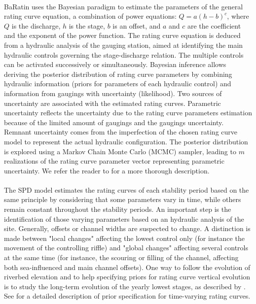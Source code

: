\documentclass[11pt]{article}
\begin{document}
    \paragraph{} BaRatin uses the Bayesian paradigm to estimate the parameters of the general rating curve equation, a combination of power equations: $Q = a(h-b)^c$, where $Q$ is the discharge, $h$ is the stage, $b$ is an offset, and $a$ and $c$ are the coefficient and the exponent of the power function. The rating curve equation is deduced from a hydraulic analysis of the gauging station, aimed at identifying the main hydraulic controls governing the stage-discharge relation. The multiple controls can be activated successively or simultaneously. Bayesian inference allows deriving the posterior distribution of rating curve parameters by combining hydraulic information (priors for parameters of each hydraulic control) and information from gaugings with uncertainty (likelihood). Two sources of uncertainty are associated with the estimated rating curves. Parametric uncertainty reflects the uncertainty due to the rating curve parameters estimation because of the limited amount of gaugings and the gaugings uncertainty. Remnant uncertainty comes from the imperfection of the chosen rating curve model to represent the actual hydraulic configuration. The posterior distribution is explored using a Markov Chain Monte Carlo (MCMC) sampler, leading to $m$ realizations of the rating curve parameter vector representing parametric uncertainty. We refer the reader to \citet{le_coz_combining_2014} for a more thorough description.

    \paragraph{}
    The SPD model estimates the rating curves of each stability period based on the same principle by considering that some parameters vary in time, while others remain constant throughout the stability periods. An important step is the identification of those varying parameters based on an hydraulic analysis of the site. Generally, offsets or channel widths are suspected to change. A distinction is made between "local changes" affecting the lowest control only (for instance the movement of the controlling riffle) and "global changes" affecting several controls at the same time (for instance, the scouring or filling of the channel, affecting both sea-influenced and main channel offsets). One way to follow the evolution of riverbed elevation and to help specifying priors for rating curve vertical evolution is to study the long-term evolution of the yearly lowest stages, as described by \citet{lapuszek_methods_2015}. See \citet{mansanarez_shift_2019} for a detailed description of prior specification for time-varying rating curves. 
    
\end{document}
